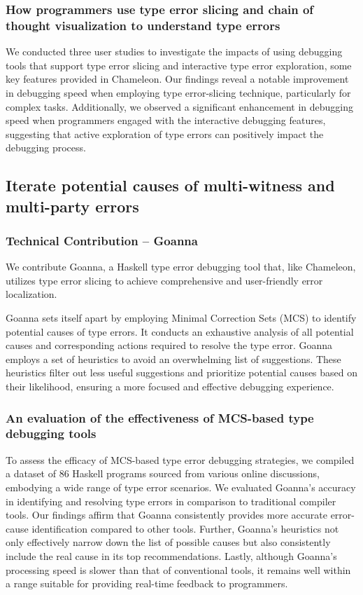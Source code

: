\subsubsection{How programmers use type error slicing and chain of thought visualization to understand type errors}
We conducted three user studies to investigate the impacts of using debugging tools that support type error slicing and interactive type error exploration, some key features provided in Chameleon. Our findings reveal a notable improvement in debugging speed when employing type error-slicing technique, particularly for complex tasks. Additionally, we observed a significant enhancement in debugging speed when programmers engaged with the interactive debugging features, suggesting that active exploration of type errors can positively impact the debugging process.

\subsection{Iterate potential causes of multi-witness and multi-party errors}

\subsubsection{Technical Contribution -- Goanna}

We contribute Goanna, a Haskell type error debugging tool that, like Chameleon, utilizes type error slicing to achieve comprehensive  and user-friendly error localization.

Goanna sets itself apart by employing Minimal Correction Sets (MCS) to identify potential causes of type errors. It conducts an exhaustive analysis of all potential causes and corresponding actions required to resolve the type error. Goanna employs a set of heuristics to avoid an overwhelming list of suggestions. These heuristics filter out less useful suggestions and prioritize potential causes based on their likelihood, ensuring a more focused and effective debugging experience.


\subsubsection{An evaluation of the effectiveness of MCS-based type debugging tools}
To assess the efficacy of MCS-based type error debugging strategies, we compiled a dataset of 86 Haskell programs sourced from various online discussions, embodying a wide range of type error scenarios. We evaluated Goanna's accuracy in identifying and resolving type errors in comparison to traditional compiler tools. Our findings affirm that Goanna consistently provides more accurate error-cause identification compared to other tools. Further, Goanna's heuristics not only effectively narrow down the list of possible causes but also consistently include the real cause in its top recommendations. Lastly, although Goanna's processing speed is slower than that of conventional tools, it remains well within a range suitable for providing real-time feedback to programmers. 

